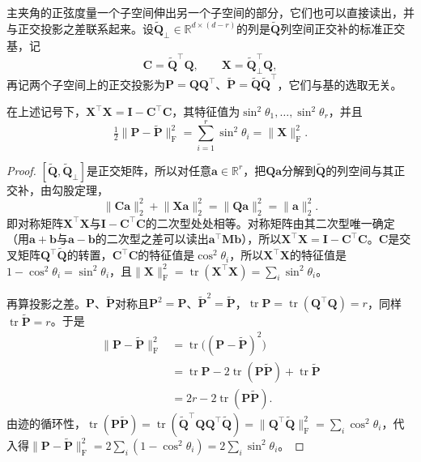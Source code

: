 主夹角的正弦度量一个子空间伸出另一个子空间的部分，它们也可以直接读出，并与正交投影之差联系起来。设$\widetilde{\bm Q}_\perp\in\mathbb R^{d\times(d-r)}$的列是$\widetilde{\bm Q}$列空间正交补的标准正交基，记
\[
 \bm C=\widetilde{\bm Q}^\top\bm Q,\qquad\bm X=\widetilde{\bm Q}_\perp^\top\bm Q ,
\]
再记两个子空间上的正交投影为$\bm P=\bm Q\bm Q^\top$、$\widetilde{\bm P}=\widetilde{\bm Q}\widetilde{\bm Q}^\top$，它们与基的选取无关。
\begin{theorem}[主夹角的正弦与投影之差]
\label{thm:ls-principal-angle-projection}
在上述记号下，$\bm X^\top\bm X=\bm I-\bm C^\top\bm C$，其特征值为$\sin^2\theta_1,\ldots,\sin^2\theta_r$，并且
\[
 \tfrac12\lVert\bm P-\widetilde{\bm P}\rVert_{\mathrm F}^2=\sum_{i=1}^r\sin^2\theta_i=\lVert\bm X\rVert_{\mathrm F}^2 .
\]
\end{theorem}
\begin{proof}
$[\widetilde{\bm Q},\widetilde{\bm Q}_\perp]$是正交矩阵，所以对任意$\bm a\in\mathbb R^r$，把$\bm Q\bm a$分解到$\widetilde{\bm Q}$的列空间与其正交补，由勾股定理，
\[
 \lVert\bm C\bm a\rVert_2^2+\lVert\bm X\bm a\rVert_2^2=\lVert\bm Q\bm a\rVert_2^2=\lVert\bm a\rVert_2^2 .
\]
即对称矩阵$\bm X^\top\bm X$与$\bm I-\bm C^\top\bm C$的二次型处处相等。对称矩阵由其二次型唯一确定（用$\bm a+\bm b$与$\bm a-\bm b$的二次型之差可以读出$\bm a^\top\bm M\bm b$），所以$\bm X^\top\bm X=\bm I-\bm C^\top\bm C$。$\bm C$是交叉矩阵$\bm Q^\top\widetilde{\bm Q}$的转置，$\bm C^\top\bm C$的特征值是$\cos^2\theta_i$，所以$\bm X^\top\bm X$的特征值是$1-\cos^2\theta_i=\sin^2\theta_i$，且$\lVert\bm X\rVert_{\mathrm F}^2=\operatorname{tr}(\bm X^\top\bm X)=\sum_i\sin^2\theta_i$。

再算投影之差。$\bm P$、$\widetilde{\bm P}$对称且$\bm P^2=\bm P$、$\widetilde{\bm P}^2=\widetilde{\bm P}$，$\operatorname{tr}\bm P=\operatorname{tr}(\bm Q^\top\bm Q)=r$，同样$\operatorname{tr}\widetilde{\bm P}=r$。于是
\[
 \begin{aligned}
 \lVert\bm P-\widetilde{\bm P}\rVert_{\mathrm F}^2
 &=\operatorname{tr}\bigl((\bm P-\widetilde{\bm P})^2\bigr)\\
 &=\operatorname{tr}\bm P-2\operatorname{tr}(\bm P\widetilde{\bm P})+\operatorname{tr}\widetilde{\bm P}\\
 &=2r-2\operatorname{tr}(\bm P\widetilde{\bm P}).
 \end{aligned}
\]
由迹的循环性，$\operatorname{tr}(\bm P\widetilde{\bm P})=\operatorname{tr}(\widetilde{\bm Q}^\top\bm Q\bm Q^\top\widetilde{\bm Q})=\lVert\bm Q^\top\widetilde{\bm Q}\rVert_{\mathrm F}^2=\sum_i\cos^2\theta_i$，代入得$\lVert\bm P-\widetilde{\bm P}\rVert_{\mathrm F}^2=2\sum_i(1-\cos^2\theta_i)=2\sum_i\sin^2\theta_i$。
\end{proof}
